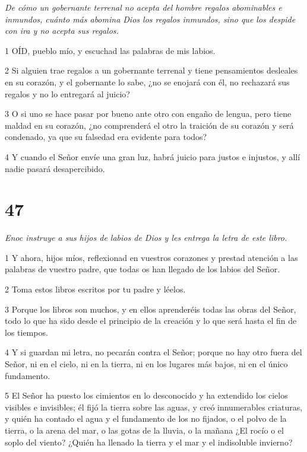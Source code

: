 \par \textit{De cómo un gobernante terrenal no acepta del hombre regalos abominables e inmundos, cuánto más abomina Dios los regalos inmundos, sino que los despide con ira y no acepta sus regalos.}

\par 1 OÍD, pueblo mío, y escuchad las palabras de mis labios.

\par 2 Si alguien trae regalos a un gobernante terrenal y tiene pensamientos desleales en su corazón, y el gobernante lo sabe, ¿no se enojará con él, no rechazará sus regalos y no lo entregará al juicio?

\par 3 O si uno se hace pasar por bueno ante otro con engaño de lengua, pero tiene maldad en su corazón, ¿no comprenderá el otro la traición de su corazón y será condenado, ya que su falsedad era evidente para todos?

\par 4 Y cuando el Señor envíe una gran luz, habrá juicio para justos e injustos, y allí nadie pasará desapercibido.

\chapter{47}

\par \textit{Enoc instruye a sus hijos de labios de Dios y les entrega la letra de este libro.}

\par 1 Y ahora, hijos míos, reflexionad en vuestros corazones y prestad atención a las palabras de vuestro padre, que todas os han llegado de los labios del Señor.

\par 2 Toma estos libros escritos por tu padre y léelos.

\par 3 Porque los libros son muchos, y en ellos aprenderéis todas las obras del Señor, todo lo que ha sido desde el principio de la creación y lo que será hasta el fin de los tiempos.

\par 4 Y si guardan mi letra, no pecarán contra el Señor; porque no hay otro fuera del Señor, ni en el cielo, ni en la tierra, ni en los lugares más bajos, ni en el único fundamento.

\par 5 El Señor ha puesto los cimientos en lo desconocido y ha extendido los cielos visibles e invisibles; él fijó la tierra sobre las aguas, y creó innumerables criaturas, y quién ha contado el agua y el fundamento de los no fijados, o el polvo de la tierra, o la arena del mar, o las gotas de la lluvia, o la mañana ¿El rocío o el soplo del viento? ¿Quién ha llenado la tierra y el mar y el indisoluble invierno?

